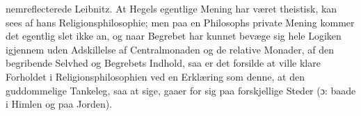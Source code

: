 \documentclass[12pt]{book}
\newcommand{\dsi}{\textup{ɔ:}}
\newcommand{\secrule}{\begin{center}%
  \rule{0.20\linewidth}{0.4pt}\\[1.3pt]\rule{0.20\linewidth}{0.4pt}\end{center}}
\begin{document}
nemreflecterede Leibnitz. At Hegels egentlige Mening har været theistisk, kan sees af hans
Religionsphilosophie; men paa en Philosophs private Mening kommer det egentlig slet ikke
an, og naar Begrebet har kunnet bevæge sig hele Logiken igjennem uden Adskillelse af
Centralmonaden og de relative Monader, af den begribende Selvhed og Begrebets Indhold, saa
er det forsilde at ville klare Forholdet i Religionsphilosophien ved en Erklæring som
denne, at den guddommelige Tankeleg, saa at sige, gaaer for sig paa forskjellige Steder
(\dsi{} baade i Himlen og paa Jorden).
\end{document}
